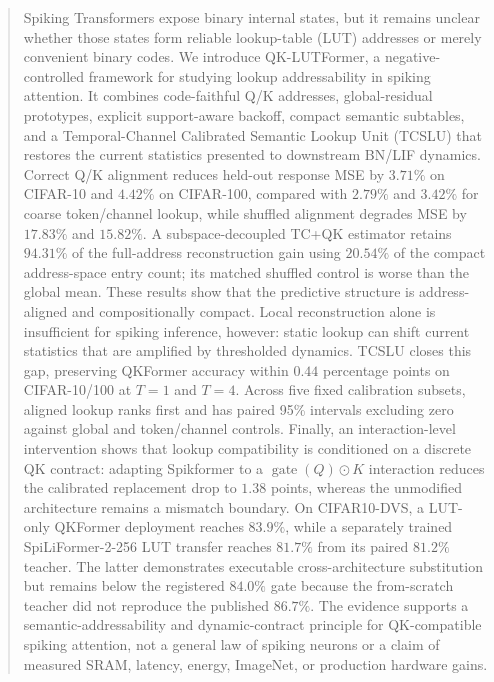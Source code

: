 \begin{abstract}
Spiking Transformers expose binary internal states, but it remains unclear
whether those states form reliable lookup-table (LUT) addresses or merely
convenient binary codes. We introduce QK-LUTFormer, a negative-controlled
framework for studying lookup addressability in spiking attention. It combines
code-faithful Q/K addresses, global-residual prototypes, explicit
support-aware backoff, compact semantic subtables, and a
Temporal-Channel Calibrated Semantic Lookup Unit (TCSLU) that restores the
current statistics presented to downstream BN/LIF dynamics. Correct Q/K
alignment reduces held-out response MSE by $3.71\%$ on CIFAR-10 and $4.42\%$
on CIFAR-100, compared with $2.79\%$ and $3.42\%$ for coarse token/channel
lookup, while shuffled alignment degrades MSE by $17.83\%$ and $15.82\%$.
A subspace-decoupled TC+QK estimator retains $94.31\%$ of the full-address
reconstruction gain using $20.54\%$ of the compact address-space entry count;
its matched shuffled control is worse than the global mean. These results show
that the predictive structure is address-aligned and compositionally compact.
Local reconstruction alone is insufficient for spiking inference, however:
static lookup can shift current statistics that are amplified by thresholded
dynamics. TCSLU closes this gap, preserving QKFormer accuracy within $0.44$
percentage points on CIFAR-10/100 at $T=1$ and $T=4$. Across five fixed
calibration subsets, aligned lookup ranks first and has paired 95\% intervals
excluding zero against global and token/channel controls. Finally, an
interaction-level intervention shows that lookup compatibility is conditioned
on a discrete QK contract: adapting Spikformer to a
$\operatorname{gate}(Q)\odot K$ interaction reduces the calibrated replacement
drop to $1.38$ points, whereas the unmodified architecture remains a mismatch
boundary. On CIFAR10-DVS, a LUT-only QKFormer deployment reaches $83.9\%$,
while a separately trained SpiLiFormer-2-256 LUT transfer reaches $81.7\%$
from its paired $81.2\%$ teacher. The latter demonstrates executable
cross-architecture substitution but remains below the registered $84.0\%$
gate because the from-scratch teacher did not reproduce the published
$86.7\%$. The evidence supports a semantic-addressability and dynamic-contract
principle for QK-compatible spiking attention, not a general law of spiking
neurons or a claim of measured SRAM, latency, energy, ImageNet, or production
hardware gains.
\end{abstract}
